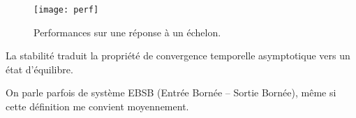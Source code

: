 \begin{figure}[!h]
\centering
\texttt{[image: perf]}
\caption{Performances sur une réponse à un échelon.}
\end{figure}

\begin{defi}[Stabilité]

La stabilité traduit la propriété de convergence temporelle asymptotique vers
un état d'équilibre. 

On parle parfois de système EBSB (Entrée Bornée -- Sortie Bornée), même si cette définition me convient moyennement.
\end{defi}



